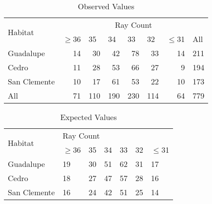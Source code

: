 \documentclass[twocolumn]{article}
\newcommand{\setsection}[1]{\setcounter{section}{#1}\addtocounter{section}{-1}\section{}}
\begin{document}
\begin{table}[h]
\centering
\begin{tabular}{lrrrrrrr}
\hline
\multirow{2}{*}{Habitat} & \multicolumn{7}{c}{Ray Count}                                                                                                                                                  \\ \cline{2-8} 
                         & \multicolumn{1}{l}{$\geq$36} & \multicolumn{1}{l}{35} & \multicolumn{1}{l}{34} & \multicolumn{1}{l}{33} & \multicolumn{1}{l}{32} & \multicolumn{1}{l}{$\leq$31} & \multicolumn{1}{l}{All}  \\ \hline
Guadalupe                & 14                     & 30                     & 42                     & 78                     & 33                     & 14                     & \multicolumn{1}{|r}{211} \\
Cedro                    & 11                     & 28                     & 53                     & 66                     & 27                     & 9                      & \multicolumn{1}{|r}{194} \\
San Clemente             & 10                     & 17                     & 61                     & 53                     & 22                     & 10                     & \multicolumn{1}{|r}{173} \\ \cline{2-7}
All                      & 71                     & 110                    & 190                    & 230                    & 114                    & 64                     & 779                      \\ \hline
\end{tabular}
\caption{Observed Values}
\end{table}

\begin{table}[h]
\centering
\begin{tabular}{@{}lllllll@{}}
\toprule
\multirow{2}{*}{Habitat} & \multicolumn{6}{l}{Ray Count} \\ \cmidrule(l){2-7} 
                         & $\geq$36  & 35  & 34 & 33 & 32 & $\leq$31 \\ \midrule
Guadalupe                & 19  & 30  & 51 & 62 & 31 & 17 \\
Cedro                    & 18  & 27  & 47 & 57 & 28 & 16 \\
San Clemente             & 16  & 24  & 42 & 51 & 25 & 14 \\ \bottomrule
\end{tabular}
\caption{Expected Values}
\end{table}

\setsection{17}

\setsection{19}

\setsection{22}

\setsection{25}

\setsection{29}
\end{document}
